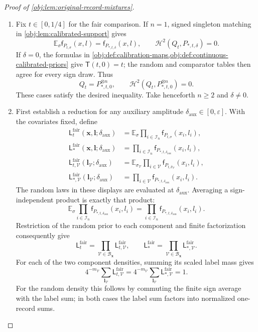 \begin{proof}[Proof of \cref{obj:lem:original-record-mixtures}]
\begin{enumerate}
\item Fix \(t\in[0,1/4]\) for the fair comparison. If \(n=1\), signed
singleton matching in \cref{obj:lem:calibrated-support} gives
\[
\mathbb E_\sigma\mathsf f_{P_{t,\sigma}}(x,l)
=\mathsf f_{P_{*,t,\delta}}(x,l),
\qquad
\mathcal H^2(Q_t,P_{*,t,\delta})=0.
\]
If \(\delta=0\), the formulas in
\cref{obj:def:calibration-maps,obj:def:continuous-calibrated-priors}
give \(\mathsf T(t,0)=t\); the random and comparator tables then agree
for every sign draw. Thus
\[
Q_t=P_{*,t,0}^{\otimes n},
\qquad
\mathcal H^2(Q_t,P_{*,t,0}^{\otimes n})=0.
\]
These cases satisfy the desired inequality. Take henceforth \(n\ge2\)
and \(\delta\ne0\).

\item First establish a reduction for any auxiliary amplitude
\(\delta_{\mathrm{aux}}\in[0,\varepsilon]\). With the covariates fixed,
define
\[
\begin{aligned}
\mathsf L_t^{\mathrm{fair}}(\mathbf x,\boldsymbol l;\delta_{\mathrm{aux}})
&=\mathbb E_\sigma\prod_{i\in\mathcal I_n}
\mathsf f_{P_{t,\sigma}}(x_i,l_i),\\
\mathsf L_*^{\mathrm{fair}}(\mathbf x,\boldsymbol l;\delta_{\mathrm{aux}})
&=\prod_{i\in\mathcal I_n}
\mathsf f_{P_{*,t,\delta_{\mathrm{aux}}}}(x_i,l_i),\\
\mathsf L_{t,\mathcal V}^{\mathrm{fair}}
(\boldsymbol l_{\mathcal V};\delta_{\mathrm{aux}})
&=\mathbb E_{\sigma_{\mathcal V}}\prod_{i\in\mathcal V}
\mathsf f_{P_{t,\widehat\sigma_{\mathcal V}}}(x_i,l_i),\\
\mathsf L_{*,\mathcal V}^{\mathrm{fair}}
(\boldsymbol l_{\mathcal V};\delta_{\mathrm{aux}})
&=\prod_{i\in\mathcal V}
\mathsf f_{P_{*,t,\delta_{\mathrm{aux}}}}(x_i,l_i).
\end{aligned}
\]
The random laws in these displays are evaluated at
\(\delta_{\mathrm{aux}}\). Averaging a sign-independent product is
exactly that product:
\[
\mathbb E_\sigma
\prod_{i\in\mathcal I_n}
\mathsf f_{P_{*,t,\delta_{\mathrm{aux}}}}(x_i,l_i)
=
\prod_{i\in\mathcal I_n}
\mathsf f_{P_{*,t,\delta_{\mathrm{aux}}}}(x_i,l_i).
\]
Restriction of the random prior to each component and finite
factorization consequently give
\[
\mathsf L_t^{\mathrm{fair}}
=\prod_{\mathcal V\in\mathscr B_{\mathbf x}}
\mathsf L_{t,\mathcal V}^{\mathrm{fair}},
\qquad
\mathsf L_*^{\mathrm{fair}}
=\prod_{\mathcal V\in\mathscr B_{\mathbf x}}
\mathsf L_{*,\mathcal V}^{\mathrm{fair}}.
\]
For each of the two component densities, summing its scaled label
mass gives
\[
4^{-m_{\mathcal V}}
\sum_{\boldsymbol l_{\mathcal V}}
\mathsf L_{t,\mathcal V}^{\mathrm{fair}}
=
4^{-m_{\mathcal V}}
\sum_{\boldsymbol l_{\mathcal V}}
\mathsf L_{*,\mathcal V}^{\mathrm{fair}}
=1.
\]
For the random density this follows by commuting the finite sign
average with the label sum; in both cases the label sum factors into
normalized one-record sums.


\end{enumerate}
\end{proof}
